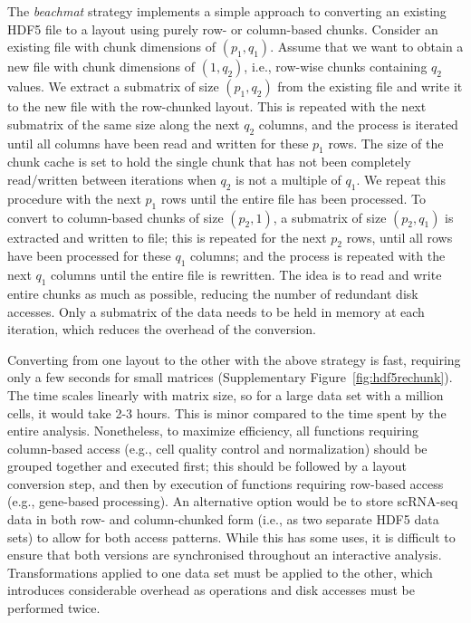 \documentclass{article}
\newcommand{\beachmat}{\textit{beachmat}}
\begin{document}
The \beachmat{} strategy implements a simple approach to converting an existing HDF5 file to a layout using purely row- or column-based chunks.
Consider an existing file with chunk dimensions of $(p_1, q_1)$. 
Assume that we want to obtain a new file with chunk dimensions of $(1, q_2)$, i.e., row-wise chunks containing $q_2$ values.
We extract a submatrix of size $(p_1, q_2)$ from the existing file and write it to the new file with the row-chunked layout.
This is repeated with the next submatrix of the same size along the next $q_2$ columns, and the process is iterated until all columns have been read and written for these $p_1$ rows.
The size of the chunk cache is set to hold the single chunk that has not been completely read/written between iterations when $q_2$ is not a multiple of $q_1$.
We repeat this procedure with the next $p_1$ rows until the entire file has been processed.
To convert to column-based chunks of size $(p_2, 1)$, a submatrix of size $(p_2, q_1)$ is extracted and written to file; this is repeated for the next $p_2$ rows, until all rows have been processed for these $q_1$ columns; and the process is repeated with the next $q_1$ columns until the entire file is rewritten.
The idea is to read and write entire chunks as much as possible, reducing the number of redundant disk accesses.
Only a submatrix of the data needs to be held in memory at each iteration, which reduces the overhead of the conversion.

Converting from one layout to the other with the above strategy is fast, requiring only a few seconds for small matrices (Supplementary Figure~\ref{fig:hdf5rechunk}).
The time scales linearly with matrix size, so for a large data set with a million cells, it would take 2-3 hours.
This is minor compared to the time spent by the entire analysis.
Nonetheless, to maximize efficiency, all functions requiring column-based access (e.g., cell quality control and normalization) should be grouped together and executed first; 
this should be followed by a layout conversion step, and then by execution of functions requiring row-based access (e.g., gene-based processing).
An alternative option would be to store scRNA-seq data in both row- and column-chunked form (i.e., as two separate HDF5 data sets) to allow for both access patterns.
While this has some uses, it is difficult to ensure that both versions are synchronised throughout an interactive analysis.
Transformations applied to one data set must be applied to the other, which introduces considerable overhead as operations and disk accesses must be performed twice.
\end{document}
